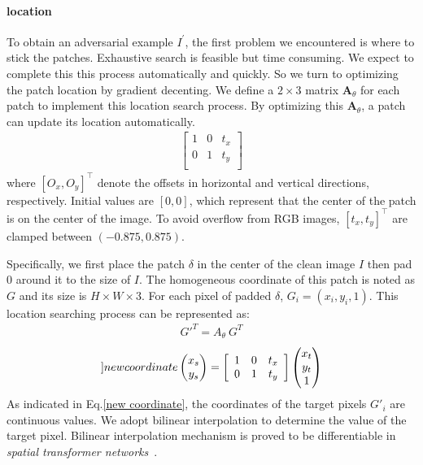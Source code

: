 \documentclass[10pt,twocolumn,letterpaper]{article}
\begin{document}
\paragraph{location}
To obtain an adversarial example $I^{'}$,
the first problem we encountered is where to stick the patches.
Exhaustive search is feasible but time consuming. We expect to
complete this this process automatically and quickly.
So we turn to optimizing the patch location 
by gradient decenting.  
We define a $2 \times 3$ matrix 
$\mathbf{A}_\theta$ for each patch to implement this 
location search process.
By optimizing this $\mathbf{A}_\theta$, a patch can update its 
location automatically.
\begin{align}
	\left[
		\begin{array}{ccc}
			1 & 0 & t_x \\
			0 & 1 & t_y \\
		\end{array}
		\right]      
\end{align}
where $[O_x,O_y]^\top$ denote the offsets in 
horizontal and vertical directions, respectively. 
Initial values are $[0,0]$, which represent
that the center of the patch is on the center of the image.
To avoid overflow from RGB images, $[t_x,t_y]^\top$ are
clamped between $(-0.875,0.875)$.

Specifically, we first place the patch $\delta$
in the center of the 
clean image $I$
then pad 0 around it to the size of $I$.
The homogeneous coordinate of this 
patch is noted as $G$ and its size is $H\times W\times 3$.
For each pixel of padded $\delta$, $G_i = (x_i, y_i, 1)$.
This location searching process can be represented as:
\begin{align}
	{G'}^T = A_{\theta}~{G}^T
\end{align}
\begin{align}
	\label[]{new coordinate}
\begin{pmatrix}
	x_s\\
	y_s	
	\end{pmatrix} = 
		\left[
			\begin{array}{ccc}
				1 & 0 & t_x \\
				0 & 1 & t_y \\
			\end{array}
			\right] 
			\begin{pmatrix}
				x_t\\
				y_t\\
				1	
				\end{pmatrix} 
\end{align}
As indicated in Eq.\ref{new coordinate},
the coordinates of the target pixels $G'_i$ are continuous values. 
We adopt bilinear interpolation to determine the value of 
the target pixel. 
Bilinear interpolation mechanism is proved 
to be differentiable in 
\textit{spatial transformer networks}~\cite{stn}.
\end{document}
